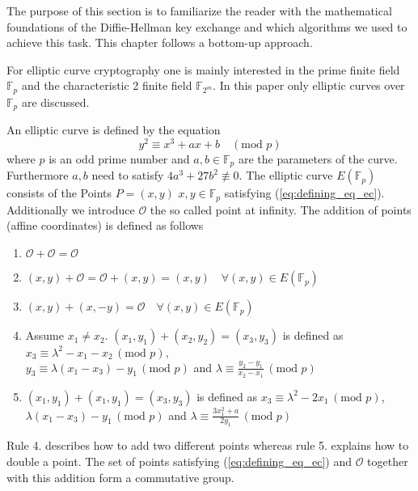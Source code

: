 The purpose of this section is to familiarize the reader with the mathematical foundations of the Diffie-Hellman key exchange and which algorithms we used to achieve this task. This chapter follows a bottom-up approach.

 For elliptic curve cryptography one is mainly interested in the prime finite field $\mathbb{F}_p$ and the characteristic 2 finite field $\mathbb{F}_{2^m}$. In this paper only elliptic curves over $\mathbb{F}_p$ are discussed.


An elliptic curve is defined by the equation
\begin{equation}\label{eq:defining_eq_ec}
y^2 \equiv x^3 + ax + b \quad (\text{mod } p)
\end{equation}
where $p$ is an odd prime number and $a,b \in \mathbb{F}_p$ are the parameters of the curve. Furthermore $a, b$ need to satisfy $4a^3 + 27b^2 \not\equiv 0$. The elliptic curve $E\left(\mathbb{F}_p\right)$ consists of the Points $P=(x,y)$ $x,y \in \mathbb{F}_p$ satisfying (\ref{eq:defining_eq_ec}). Additionally we introduce $\mathcal{O}$ the so called point at infinity. The addition of points (affine coordinates) is defined as follows \cite{Brown:2009}
\begin{enumerate}
\item{$\mathcal{O} + \mathcal{O} = \mathcal{O}$}
\item{$(x,y) + \mathcal{O} = \mathcal{O} + (x,y) = (x,y) \quad \forall (x,y) \in E(\mathbb{F}_p)$}
\item{$(x,y) + (x,-y) = \mathcal{O} \quad \forall (x,y) \in E(\mathbb{F}_p)$}
\item{Assume  $x_1 \neq x_2$. $(x_1, y_1) + (x_2, y_2) = (x_3, y_3)$ is defined as $x_3 \equiv \lambda^2 - x_1 - x_2 \, (\text{mod } p),$ \\ $y_3 \equiv \lambda(x_1 - x_3) - y_1 \, (\text{mod } p)$ and $\lambda \equiv \frac{y_2 - y_1}{x_2 - x_1} \, (\text{mod } p)$}
\item{$(x_1, y_1) + (x_1, y_1) = (x_3, y_3)$ is defined as $x_3 \equiv \lambda^2 -2 x_1 \, (\text{mod } p)$, $\lambda (x_1 - x_3) - y_1  \, (\text{mod } p)$ and $\lambda \equiv \frac{3 x_1^2 + a}{2y_1} \, (\text{mod } p)$}
\end{enumerate}
Rule 4. describes how to add two different points whereas rule 5. explains how to double a point. The set of points satisfying (\ref{eq:defining_eq_ec}) and $\mathcal{O}$ together with this addition form a commutative group.

